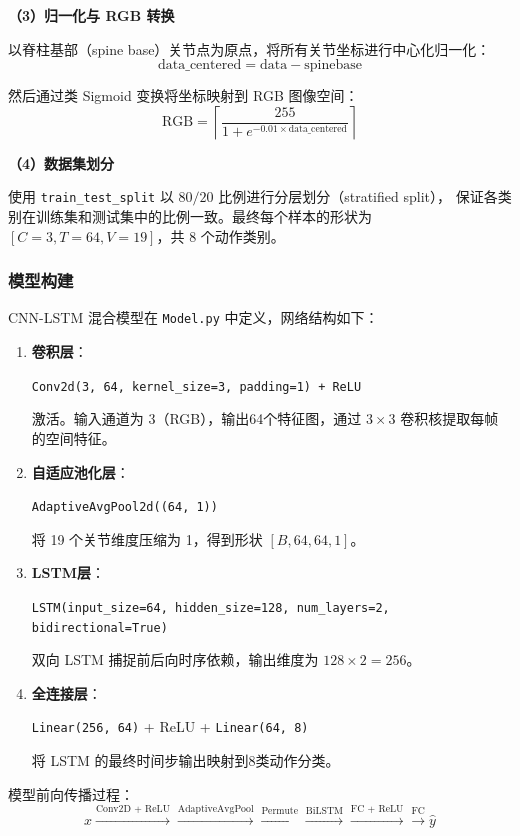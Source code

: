 \documentclass[UTF8]{ctexart}
\begin{document}
\textbf{（3）归一化与 RGB 转换}

以脊柱基部（spine base）关节点为原点，将所有关节坐标进行中心化归一化：
\[
\text{data\_centered} = \text{data} - \text{spinebase}
\]

然后通过类 Sigmoid 变换将坐标映射到 RGB 图像空间：
\[
\text{RGB} = \left\lceil \frac{255}{1 + e^{-0.01 \times \text{data\_centered}}} \right\rceil
\]

\textbf{（4）数据集划分}

使用 \texttt{train\_test\_split} 以 $80/20$ 比例进行分层划分（stratified split），
保证各类别在训练集和测试集中的比例一致。最终每个样本的形状为 $[C=3, T=64, V=19]$，共 8 个动作类别。

\subsubsection{模型构建}

CNN-LSTM 混合模型在 \texttt{Model.py} 中定义，网络结构如下：

\begin{enumerate}
  \item \textbf{卷积层}：
        \begin{center}
          \texttt{Conv2d(3, 64, kernel\_size=3, padding=1) + ReLU}
        \end{center}
        激活。输入通道为 3（RGB），输出64个特征图，通过 $3 \times 3$ 卷积核提取每帧的空间特征。
  \item \textbf{自适应池化层}：
        \begin{center}
          \texttt{AdaptiveAvgPool2d((64, 1))}
        \end{center}
        将 19 个关节维度压缩为 1，得到形状 $[B, 64, 64, 1]$。
  \item \textbf{LSTM层}：
        \begin{center}
          \texttt{LSTM(input\_size=64, hidden\_size=128, num\_layers=2, bidirectional=True)}
        \end{center}
        双向 LSTM 捕捉前后向时序依赖，输出维度为 $128 \times 2 = 256$。
  \item \textbf{全连接层}：
        \begin{center}
          \texttt{Linear(256, 64)} + ReLU + \texttt{Linear(64, 8)}
        \end{center}
        将 LSTM 的最终时间步输出映射到8类动作分类。
\end{enumerate}

模型前向传播过程：
\[
x \xrightarrow{\text{Conv2D + ReLU}}
  \xrightarrow{\text{AdaptiveAvgPool}}
  \xrightarrow{\text{Permute}}
  \xrightarrow{\text{BiLSTM}}
  \xrightarrow{\text{FC + ReLU}}
  \xrightarrow{\text{FC}}
\hat{y}
\]
\end{document}

